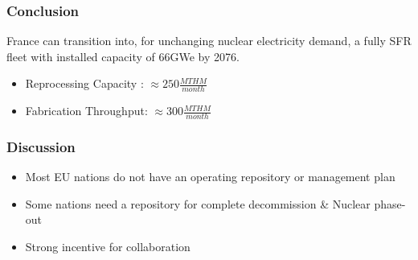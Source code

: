 \begin{frame}
	\frametitle{Conclusion}
	France can transition into, for unchanging nuclear electricity demand,
	a fully SFR fleet with installed capacity of 66GWe by 2076.
	\begin{itemize}
		\item Reprocessing Capacity : $\approx 250 \frac{MTHM}{month}$
		\item Fabrication Throughput: $\approx 300 \frac{MTHM}{month}$
	\end{itemize}
\end{frame}

\begin{frame}
	\frametitle{Discussion}
	\begin{itemize}
		\item Most EU nations do not have an operating repository or management plan
		\item Some nations need a repository for complete decommission \& Nuclear phase-out	
		\item Strong incentive for collaboration
	\end{itemize}
\end{frame}